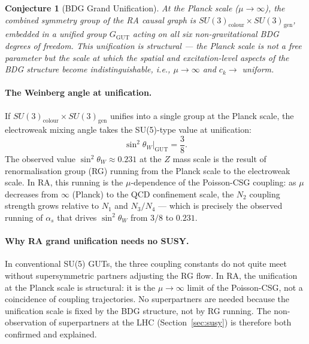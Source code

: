 \documentclass[11pt,a4paper]{article}
\newtheorem{conjecture}[theorem]{Conjecture}
\begin{document}
\begin{conjecture}[BDG Grand Unification]
\label{conj:gut}
At the Planck scale ($\mu \to \infty$), the combined symmetry group of the
RA causal graph is $SU(3)_{\mathrm{colour}} \times SU(3)_{\mathrm{gen}}$,
embedded in a unified group $G_{\mathrm{GUT}}$ acting on all six non-gravitational
BDG degrees of freedom. This unification is structural --- the Planck scale
is not a free parameter but the scale at which the spatial and excitation-level
aspects of the BDG structure become indistinguishable, i.e., $\mu \to \infty$
and $c_k \to$ uniform.
\end{conjecture}

\paragraph{The Weinberg angle at unification.}
If $SU(3)_{\mathrm{colour}} \times SU(3)_{\mathrm{gen}}$ unifies into a
single group at the Planck scale, the electroweak mixing angle takes the
SU(5)-type value at unification:
\begin{equation}
  \sin^2\theta_W\big|_{\mathrm{GUT}} = \frac{3}{8}.
  \label{eq:weinberg_gut}
\end{equation}
The observed value $\sin^2\theta_W \approx 0.231$ at the $Z$ mass scale
is the result of renormalisation group (RG) running from the Planck scale
to the electroweak scale. In RA, this running is the $\mu$-dependence of
the Poisson-CSG coupling: as $\mu$ decreases from $\infty$ (Planck) to
the QCD confinement scale, the $N_2$ coupling strength grows relative to
$N_1$ and $N_3/N_4$ --- which is precisely the observed running of
$\alpha_s$ that drives $\sin^2\theta_W$ from $3/8$ to $0.231$.

\paragraph{Why RA grand unification needs no SUSY.}
In conventional SU(5) GUTs, the three coupling constants do not quite
meet without supersymmetric partners adjusting the RG flow. In RA, the
unification at the Planck scale is structural: it is the $\mu \to \infty$
limit of the Poisson-CSG, not a coincidence of coupling trajectories.
No superpartners are needed because the unification scale is fixed by
the BDG structure, not by RG running. The non-observation of superpartners
at the LHC (Section~\ref{sec:susy}) is therefore both confirmed and explained.
\end{document}
